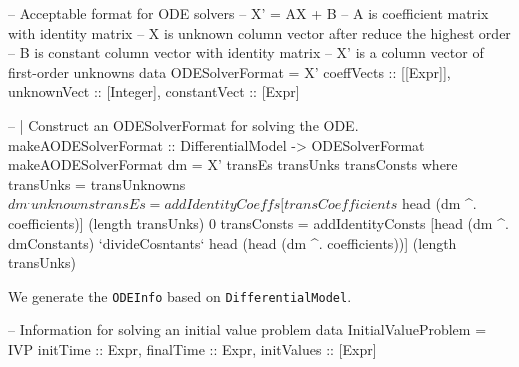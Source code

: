 \begin{listing}[ht]
\label{code_cancelcoe}
\end{listing}

\begin{listing}[ht]
\begin{haskell1}
-- Acceptable format for ODE solvers
-- X' = AX + B
-- A  is coefficient matrix with identity matrix
-- X  is unknown column vector after reduce the highest order
-- B  is constant column vector with identity matrix
-- X' is a column vector of first-order unknowns
data ODESolverFormat = X'{
  coeffVects :: [[Expr]],
  unknownVect :: [Integer],
  constantVect :: [Expr]
}
\end{haskell1}
\end{listing}

\begin{listing}[ht]
\begin{haskell1}
-- | Construct an ODESolverFormat for solving the ODE.
makeAODESolverFormat :: DifferentialModel -> ODESolverFormat
makeAODESolverFormat dm = X' transEs transUnks transConsts
  where transUnks = transUnknowns $ dm ^. unknowns
        transEs = addIdentityCoeffs [transCoefficients $ head (dm ^. coefficients)] (length transUnks) 0
        transConsts = addIdentityConsts [head (dm ^. dmConstants) `divideCosntants` head (head (dm ^. coefficients))] (length transUnks)
\end{haskell1}
\label{code_cancelcoe}
\end{listing}

We generate the \verb|ODEInfo| based on \verb|DifferentialModel|.

\begin{listing}[ht]
\begin{haskell1}
-- Information for solving an initial value problem
data InitialValueProblem = IVP{
  initTime :: Expr,
  finalTime :: Expr,
  initValues :: [Expr]
}
\end{haskell1}
\end{listing}



